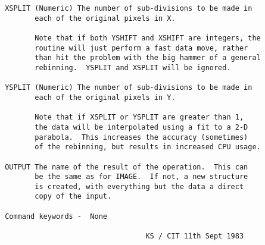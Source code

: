 \begin{description}
\begin{verbatim}
 XSPLIT (Numeric) The number of sub-divisions to be made in
        each of the original pixels in X.

        Note that if both YSHIFT and XSHIFT are integers, the
        routine will just perform a fast data move, rather
        than hit the problem with the big hammer of a general
        rebinning.  YSPLIT and XSPLIT will be ignored.

 YSPLIT (Numeric) The number of sub-divisions to be made in
        each of the original pixels in Y.

        Note that if XSPLIT or YSPLIT are greater than 1,
        the data will be interpolated using a fit to a 2-D
        parabola.  This increases the accuracy (sometimes)
        of the rebinning, but results in increased CPU usage.

 OUTPUT The name of the result of the operation.  This can
        be the same as for IMAGE.  If not, a new structure
        is created, with everything but the data a direct
        copy of the input.

 Command keywords -  None

                                  KS / CIT 11th Sept 1983
\end{verbatim}
\end{description}
